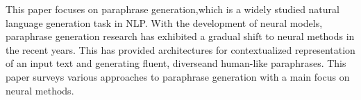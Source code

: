 This paper focuses on paraphrase generation,which is a widely studied natural language generation task in NLP. With the development of neural models, paraphrase generation research has  exhibited  a  gradual  shift  to  neural  methods  in  the  recent  years.    This  has  provided architectures for contextualized representation of an input text and generating fluent, diverseand human-like paraphrases.   This paper surveys various approaches to paraphrase generation with a main focus on neural methods.
